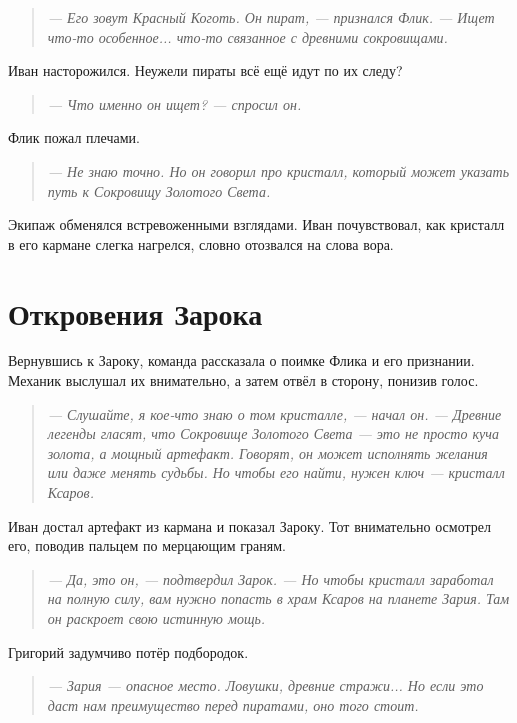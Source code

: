 \documentclass[12pt,a4paper]{book} %
\newenvironment{dialogue}{\begin{quote}\itshape}{\end{quote}}
\begin{document}
\begin{dialogue}
--- Его зовут Красный Коготь. Он пират, --- признался Флик. --- Ищет что-то особенное... что-то связанное с древними сокровищами.
\end{dialogue}

Иван насторожился. Неужели пираты всё ещё идут по их следу?

\begin{dialogue}
--- Что именно он ищет? --- спросил он.
\end{dialogue}

Флик пожал плечами.

\begin{dialogue}
--- Не знаю точно. Но он говорил про кристалл, который может указать путь к Сокровищу Золотого Света.
\end{dialogue}

Экипаж обменялся встревоженными взглядами. Иван почувствовал, как кристалл в его кармане слегка нагрелся, словно отозвался на слова вора.

\section*{Откровения Зарока}

Вернувшись к Зароку, команда рассказала о поимке Флика и его признании. Механик выслушал их внимательно, а затем отвёл в сторону, понизив голос.

\begin{dialogue}
--- Слушайте, я кое-что знаю о том кристалле, --- начал он. --- Древние легенды гласят, что Сокровище Золотого Света --- это не просто куча золота, а мощный артефакт. Говорят, он может исполнять желания или даже менять судьбы. Но чтобы его найти, нужен ключ --- кристалл Ксаров.
\end{dialogue}

Иван достал артефакт из кармана и показал Зароку. Тот внимательно осмотрел его, поводив пальцем по мерцающим граням.

\begin{dialogue}
--- Да, это он, --- подтвердил Зарок. --- Но чтобы кристалл заработал на полную силу, вам нужно попасть в храм Ксаров на планете Зария. Там он раскроет свою истинную мощь.
\end{dialogue}

Григорий задумчиво потёр подбородок.

\begin{dialogue}
--- Зария --- опасное место. Ловушки, древние стражи... Но если это даст нам преимущество перед пиратами, оно того стоит.
\end{dialogue}
\end{document}
